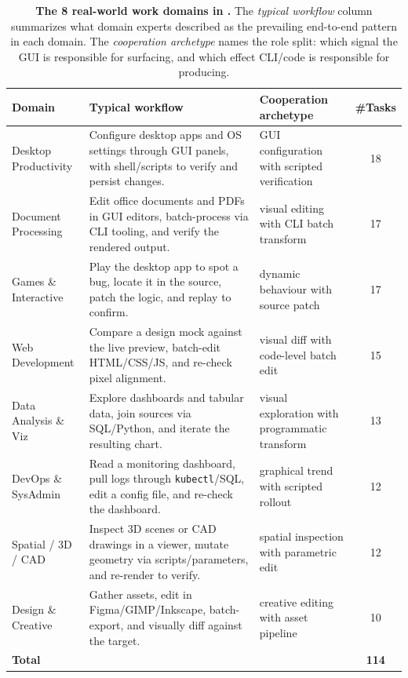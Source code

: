 \begin{table}[!htbp]
\centering
\footnotesize
\setlength{\tabcolsep}{6pt}
\renewcommand{\arraystretch}{1.2}
\caption{\textbf{The 8 real-world work domains in \Eyeson{}.} The \emph{typical workflow} column summarizes what domain experts described as the prevailing end-to-end pattern in each domain. The \emph{cooperation archetype} names the role split: which signal the GUI is responsible for surfacing, and which effect CLI/code is responsible for producing.}
\label{tab:domains}
\begin{tabularx}{\textwidth}{@{}l X p{5.2cm} c@{}}
\toprule
\textbf{Domain} & \textbf{Typical workflow} & \textbf{Cooperation archetype} & \textbf{\#Tasks} \\
\midrule
Desktop Productivity & Configure desktop apps and OS settings through GUI panels, with shell/scripts to verify and persist changes.    & GUI configuration with scripted verification   & 18 \\
Document Processing  & Edit office documents and PDFs in GUI editors, batch-process via CLI tooling, and verify the rendered output.   & visual editing with CLI batch transform        & 17 \\
Games \& Interactive  & Play the desktop app to spot a bug, locate it in the source, patch the logic, and replay to confirm.            & dynamic behaviour with source patch            & 17 \\
Web Development      & Compare a design mock against the live preview, batch-edit HTML/CSS/JS, and re-check pixel alignment.           & visual diff with code-level batch edit         & 15 \\
Data Analysis \& Viz  & Explore dashboards and tabular data, join sources via SQL/Python, and iterate the resulting chart.              & visual exploration with programmatic transform & 13 \\
DevOps \& SysAdmin    & Read a monitoring dashboard, pull logs through \texttt{kubectl}/SQL, edit a config file, and re-check the dashboard. & graphical trend with scripted rollout          & 12 \\
Spatial / 3D / CAD   & Inspect 3D scenes or CAD drawings in a viewer, mutate geometry via scripts/parameters, and re-render to verify. & spatial inspection with parametric edit        & 12 \\
Design \& Creative    & Gather assets, edit in Figma/GIMP/Inkscape, batch-export, and visually diff against the target.                 & creative editing with asset pipeline           & 10 \\
\midrule
\textbf{Total}  &                                                                                                                  &                                                & \textbf{114} \\
\bottomrule
\end{tabularx}
\end{table}

